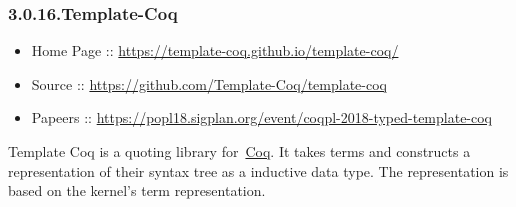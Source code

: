 \documentclass[12pt,twoside]{article}
\begin{document}
\subsubsection{3.0.16.\hspace*{0.5em}Template-Coq}\label{sec-template-coq}%

\begin{itemize}[noitemsep,topsep=\mdcompacttopsep]%

\item{}Home Page :: \href{https://template-coq.github.io/template-coq/}{{\ttfamily https://\hspace{0pt}template-\hspace{0pt}coq.\hspace{0pt}github.\hspace{0pt}io/\hspace{0pt}template-\hspace{0pt}coq/\hspace{0pt}}}%

\item{}Source :: \href{https://github.com/Template-Coq/template-coq}{{\ttfamily https://\hspace{0pt}github.\hspace{0pt}com/\hspace{0pt}Template-\hspace{0pt}Coq/\hspace{0pt}template-\hspace{0pt}coq}}%

\item{}Papeers :: \href{https://popl18.sigplan.org/event/coqpl-2018-typed-template-coq}{{\ttfamily https://\hspace{0pt}popl18.\hspace{0pt}sigplan.\hspace{0pt}org/\hspace{0pt}event/\hspace{0pt}coqpl-\hspace{0pt}2018-\hspace{0pt}typed-\hspace{0pt}template-\hspace{0pt}coq}}%
\end{itemize}%

\noindent{}Template Coq is a quoting library for~\href{http://coq.inria.fr}{Coq}. It
takes  terms and constructs a representation of their syntax tree as
a  inductive data type. The representation is based on the kernel's
term representation.%
\end{document}
